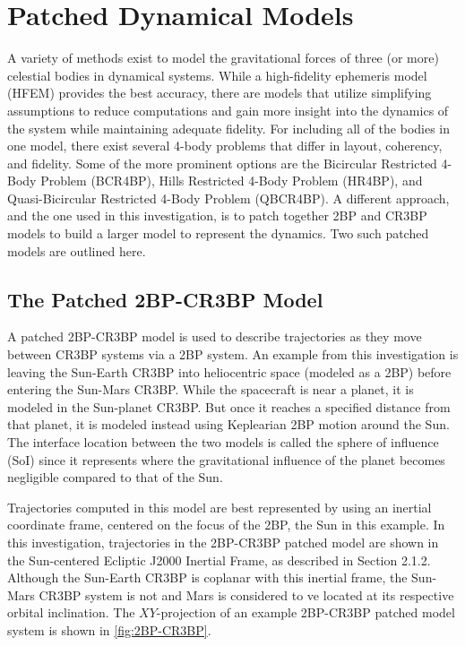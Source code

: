\section{Patched Dynamical Models}
A variety of methods exist to model the gravitational forces of three (or more) celestial bodies in
dynamical systems. While a high-fidelity ephemeris model (HFEM) provides the best accuracy, there
are models that utilize simplifying assumptions to reduce computations and gain more insight into
the dynamics of the system while maintaining adequate fidelity. For including all of the bodies in
one model, there exist several 4-body problems that differ in layout, coherency, and fidelity. Some
of the more prominent options are the Bicircular Restricted 4-Body Problem
(BCR4BP)\cite{Boudad:2018}, Hills Restricted 4-Body Problem (HR4BP)\cite{Scheeres:1998}, and
Quasi-Bicircular Restricted 4-Body Problem (QBCR4BP)\cite{Andreu:2002}. A different approach, and
the one used in this investigation, is to patch together 2BP and CR3BP models to build a larger
model to represent the dynamics. Two such patched models are outlined here.

\subsection{The Patched 2BP-CR3BP Model}
A patched 2BP-CR3BP model is used to describe trajectories as they move between CR3BP systems via a
2BP system. An example from this investigation is leaving the Sun-Earth CR3BP into heliocentric
space (modeled as a 2BP) before entering the Sun-Mars CR3BP. While the spacecraft is near a planet,
it is modeled in the Sun-planet CR3BP. But once it reaches a specified distance from that planet,
it is modeled instead using Keplearian 2BP motion around the Sun\cite{Canales:2021}. The interface
location between the two models is called the sphere of influence (SoI) since it represents where
the gravitational influence of the planet becomes negligible compared to that of the Sun.

Trajectories computed in this model are best represented by using an inertial coordinate frame,
centered on the focus of the 2BP, the Sun in this example. In this investigation, trajectories in
the 2BP-CR3BP patched model are shown in the Sun-centered Ecliptic J2000 Inertial Frame, as
described in Section 2.1.2. Although the Sun-Earth CR3BP is coplanar with this inertial frame, the
Sun-Mars CR3BP system is not and Mars is considered to ve located at its respective orbital
inclination. The $XY$-projection of an example 2BP-CR3BP patched model system is shown in
\cref{fig:2BP-CR3BP}.

